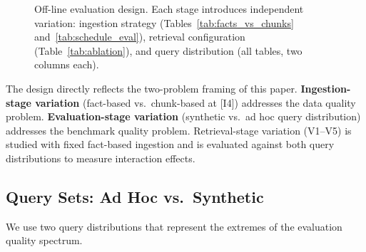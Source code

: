 \documentclass[sigconf,natbib=true]{acmart}
\begin{document}
\begin{figure}[h]
\centering
{}
\caption{Off-line evaluation design. Each stage introduces independent variation: ingestion strategy (Tables~\ref{tab:facts_vs_chunks} and~\ref{tab:schedule_eval}), retrieval configuration (Table~\ref{tab:ablation}), and query distribution (all tables, two columns each).}
\label{fig:eval_design}
\end{figure}

\noindent The design directly reflects the two-problem framing of this paper.
\textbf{Ingestion-stage variation} (fact-based vs.\ chunk-based at [I4]) addresses the data quality problem.
\textbf{Evaluation-stage variation} (synthetic vs.\ ad hoc query distribution) addresses the benchmark quality problem.
Retrieval-stage variation (V1--V5) is studied with fixed fact-based ingestion and is evaluated against both query distributions to measure interaction effects.

\subsection{Query Sets: Ad Hoc vs.\ Synthetic}
\label{sec:querysets}

We use two query distributions that represent the extremes of the evaluation quality spectrum.
\end{document}
